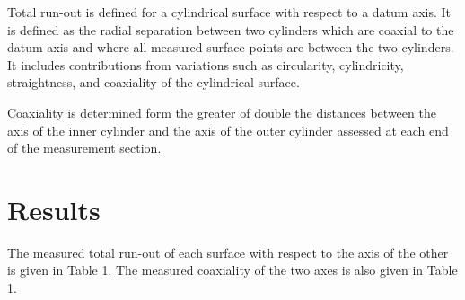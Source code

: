 \documentclass[CIPM]{MSLCalCert}
\begin{document}
Total run-out is defined for a cylindrical surface with respect to a datum axis. It is defined as the radial separation between two cylinders which are coaxial to the datum axis and where all measured surface points are between the two cylinders. It includes contributions from variations such as circularity, cylindricity, straightness, and coaxiality of the cylindrical surface.

Coaxiality is determined form the greater of double the distances between the axis of the inner cylinder and the axis of the outer cylinder assessed at each end of the measurement section.

\section{Results}
The measured total run-out of each surface with respect to the axis of the other is given in Table 1. The measured coaxiality of the two axes is also given in Table 1.
\end{document}
